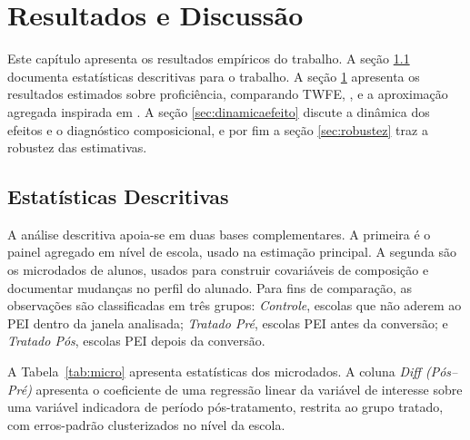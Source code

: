 \chapter{Resultados e Discussão} \label{sec:results}

Este capítulo apresenta os resultados empíricos do trabalho. A seção \ref{sec:descritivo} documenta estatísticas descritivas para o trabalho. A seção \ref{sec:results} apresenta os resultados estimados sobre proficiência, comparando TWFE, \textcite{callawaysantanna}, \textcite{santannazhao} e a aproximação agregada inspirada em \textcite{santannaxu}. A seção \ref{sec:dinamicaefeito} discute a dinâmica dos efeitos e o diagnóstico composicional, e por fim a seção \ref{sec:robustez} traz a robustez das estimativas.

\section{Estatísticas Descritivas} \label{sec:descritivo}

A análise descritiva apoia-se em duas bases complementares. A primeira é o painel agregado em nível de escola, usado na estimação principal. A segunda são os microdados de alunos, usados para construir covariáveis de composição e documentar mudanças no perfil do alunado. Para fins de comparação, as observações são classificadas em três grupos: \textit{Controle}, escolas que não aderem ao PEI dentro da janela analisada; \textit{Tratado Pré}, escolas PEI antes da conversão; e \textit{Tratado Pós}, escolas PEI depois da conversão.

A Tabela~\ref{tab:micro} apresenta estatísticas dos microdados. A coluna \textit{Diff (Pós--Pré)} apresenta o coeficiente de uma regressão linear da variável de interesse sobre uma variável indicadora de período pós-tratamento, restrita ao grupo tratado, com erros-padrão clusterizados no nível da escola.

